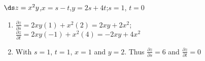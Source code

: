 {$\ds z=x^2y$,\qquad $x=s-t$,\qquad $y=2s+4t$;\qquad $s=1$, $t=0$
}
{\begin{enumerate}
	\item $\frac{\partial z}{\partial s} = 2xy(1) + x^2(2) = 2xy+2x^2$;\\
	$\frac{\partial z}{\partial t} = 2xy(-1) + x^2(4) = -2xy+4x^2$
	
	\item		With $s=1$, $t=1$, $x=1$ and $y=2$. Thus $\frac{\partial z}{\partial s} = 6$ and $\frac{\partial z}{\partial t} = 0$
\end{enumerate}
}
